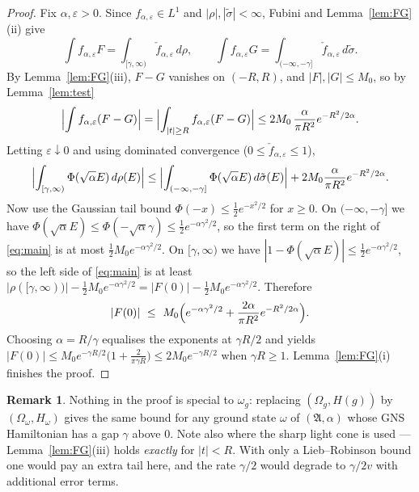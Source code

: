 \documentclass[11pt,a4paper]{article}
\theoremstyle{plain}
\theoremstyle{definition}
\newtheorem{remark}[theorem]{Remark}
\newcommand{\A}{\mathfrak{A}}
\newcommand{\Om}{\Omega}
\begin{document}
\begin{proof}
Fix $\alpha,\varepsilon>0$. Since $f_{\alpha,\varepsilon}\in L^1$ and $|\rho|,|\tilde\sigma|<\infty$,
Fubini and Lemma~\ref{lem:FG}(ii) give
\[
  \int f_{\alpha,\varepsilon}F=\int_{[\gamma,\infty)}\check f_{\alpha,\varepsilon}\,d\rho,
  \qquad
  \int f_{\alpha,\varepsilon}G=\int_{(-\infty,-\gamma]}\check f_{\alpha,\varepsilon}\,d\tilde\sigma .
\]
By Lemma~\ref{lem:FG}(iii), $F-G$ vanishes on $(-R,R)$, and $|F|,|G|\le M_0$, so by
Lemma~\ref{lem:test}
\[
  \Bigl|\int f_{\alpha,\varepsilon}(F-G)\Bigr|
  =\Bigl|\int_{|t|\ge R} f_{\alpha,\varepsilon}(F-G)\Bigr|
  \le 2M_0\,\frac{\alpha}{\pi R^2}e^{-R^2/2\alpha}.
\]
Letting $\varepsilon\downarrow0$ and using dominated convergence
($0\le\check f_{\alpha,\varepsilon}\le1$),
\begin{equation}\label{eq:main}
  \Bigl|\int_{[\gamma,\infty)}\Phi(\sqrt\alpha E)\,d\rho(E)\Bigr|
  \le \Bigl|\int_{(-\infty,-\gamma]}\Phi(\sqrt\alpha E)\,d\tilde\sigma(E)\Bigr|
      +2M_0\frac{\alpha}{\pi R^2}e^{-R^2/2\alpha}.
\end{equation}
Now use the Gaussian tail bound $\Phi(-x)\le\tfrac12e^{-x^2/2}$ for $x\ge0$. On
$(-\infty,-\gamma]$ we have $\Phi(\sqrt\alpha E)\le\Phi(-\sqrt\alpha\gamma)\le\tfrac12e^{-\alpha\gamma^2/2}$,
so the first term on the right of \eqref{eq:main} is at most $\tfrac12M_0e^{-\alpha\gamma^2/2}$.
On $[\gamma,\infty)$ we have $|1-\Phi(\sqrt\alpha E)|\le\tfrac12e^{-\alpha\gamma^2/2}$, so the left
side of \eqref{eq:main} is at least $|\rho([\gamma,\infty))|-\tfrac12M_0e^{-\alpha\gamma^2/2}
=|F(0)|-\tfrac12M_0e^{-\alpha\gamma^2/2}$. Therefore
\[
  |F(0)|\ \le\ M_0\Bigl(e^{-\alpha\gamma^2/2}+\frac{2\alpha}{\pi R^2}e^{-R^2/2\alpha}\Bigr).
\]
Choosing $\alpha=R/\gamma$ equalises the exponents at $\gamma R/2$ and yields
$|F(0)|\le M_0e^{-\gamma R/2}\bigl(1+\tfrac{2}{\pi\gamma R}\bigr)\le2M_0e^{-\gamma R/2}$ when
$\gamma R\ge1$. Lemma~\ref{lem:FG}(i) finishes the proof.
\end{proof}

\begin{remark}
Nothing in the proof is special to $\omega_g$: replacing $(\Om_g,H(g))$ by $(\Om_\omega,H_\omega)$
gives the same bound for any ground state $\omega$ of $(\A,\alpha)$ whose GNS Hamiltonian has a
gap $\gamma$ above $0$. Note also where the sharp light cone is used --- Lemma~\ref{lem:FG}(iii)
holds \emph{exactly} for $|t|<R$. With only a Lieb--Robinson bound one would pay an extra tail
here, and the rate $\gamma/2$ would degrade to $\gamma/2v$ with additional error terms.
\end{remark}
\end{document}

